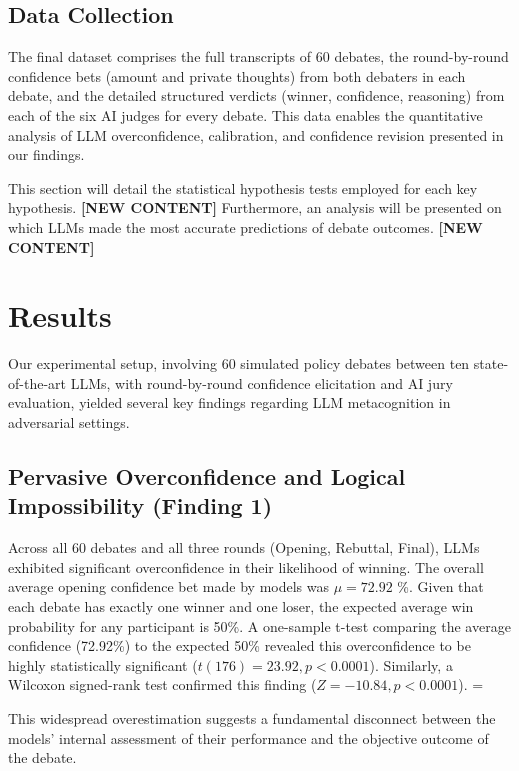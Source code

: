\documentclass{article}
\begin{document}
\subsection{Data Collection}
\label{subsec:data_collection}
The final dataset comprises the full transcripts of 60 debates, the round-by-round confidence bets (amount and private thoughts) from both debaters in each debate, and the detailed structured verdicts (winner, confidence, reasoning) from each of the six AI judges for every debate. This data enables the quantitative analysis of LLM overconfidence, calibration, and confidence revision presented in our findings.

This section will detail the statistical hypothesis tests employed for each key hypothesis. \textbf{[NEW CONTENT]}
Furthermore, an analysis will be presented on which LLMs made the most accurate predictions of debate outcomes. \textbf{[NEW CONTENT]}

\section{Results}
\label{sec:results}

\lstset{style=promptstyle} %

Our experimental setup, involving 60 simulated policy debates between ten state-of-the-art LLMs, with round-by-round confidence elicitation and AI jury evaluation, yielded several key findings regarding LLM metacognition in adversarial settings.

\subsection{Pervasive Overconfidence and Logical Impossibility (Finding 1)}

Across all 60 debates and all three rounds (Opening, Rebuttal, Final), LLMs exhibited significant overconfidence in their likelihood of winning. The overall average opening confidence bet made by models was $\mu = 72.92$ \%. Given that each debate has exactly one winner and one loser, the expected average win probability for any participant is 50\%. A one-sample t-test comparing the average confidence (72.92\%) to the expected 50\% revealed this overconfidence to be highly statistically significant ($t(176) = 23.92, p < 0.0001$). Similarly, a Wilcoxon signed-rank test confirmed this finding ($Z= -10.84, p < 0.0001$). =

This widespread overestimation suggests a fundamental disconnect between the models' internal assessment of their performance and the objective outcome of the debate.
\end{document}
